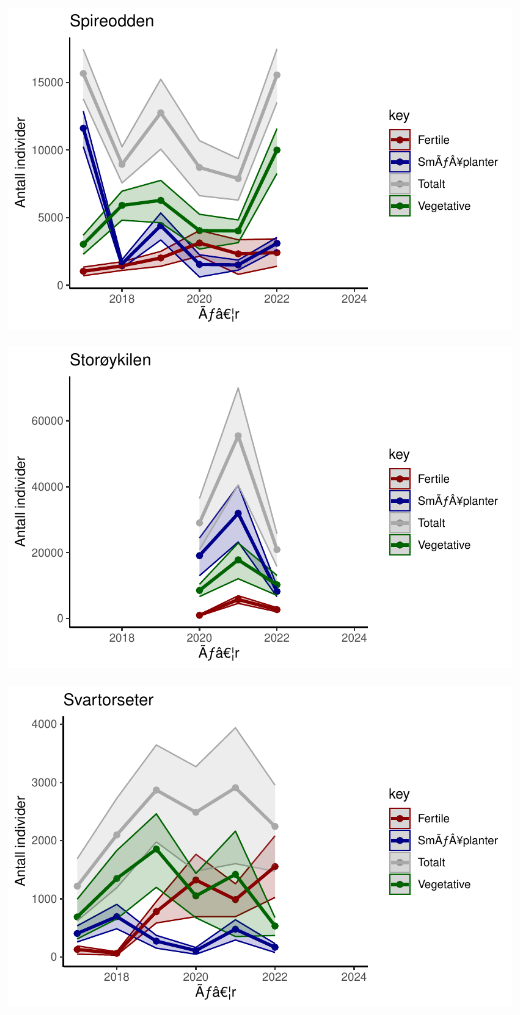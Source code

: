 \documentclass[
  letterpaper,
  DIV=11,
  numbers=noendperiod]{scrreport}
\begin{document}
\includegraphics{localEst_files/figure-pdf/unnamed-chunk-4-8.pdf}

\includegraphics{localEst_files/figure-pdf/unnamed-chunk-4-9.pdf}

\includegraphics{localEst_files/figure-pdf/unnamed-chunk-4-10.pdf}
\end{document}
